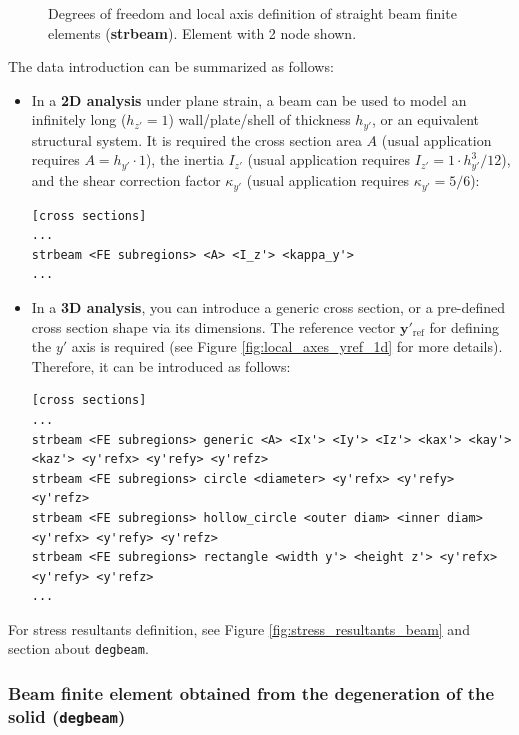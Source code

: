\documentclass[a4paper,fleqn]{book}
\begin{document}
\begin{figure}[h]

\caption{Degrees of freedom and local axis definition of straight beam finite elements (\textbf{strbeam}). Element with 2 node shown.}
\label{fig:strbeam}
\end{figure}

The data introduction can be summarized as follows:
\begin{itemize}
  \item In a \textbf{2D analysis} under plane strain, a beam can be used to model an infinitely long ($h_{z'}=1$) wall/plate/shell of thickness $h_{y'}$, or an equivalent structural system. It is required the cross section area $A$ (usual application requires $A = h_{y'}\cdot 1$), the inertia $I_{z'}$ (usual application requires $I_{z'} = 1\cdot h_{y'}^3/12$), and the shear correction factor $\kappa_{y'}$ (usual application requires $\kappa_{y'}=5/6$):
\begin{Verbatim}[frame=single, fontsize=\small, label={format of section [cross sections] for strbeam elements}]
[cross sections]
...
strbeam <FE subregions> <A> <I_z'> <kappa_y'>
...
\end{Verbatim}
  \item  In a \textbf{3D analysis}, you can introduce a generic cross section, or a pre-defined cross section shape via its dimensions. The reference vector $\mathbf{y}'_\mathrm{ref}$ for defining the $y'$ axis is required (see Figure \ref{fig:local_axes_yref_1d} for more details). Therefore, it can be introduced as follows:
\begin{Verbatim}[frame=single, fontsize=\footnotesize, label={format of section [cross sections] for strbeam elements}]
[cross sections]
...
strbeam <FE subregions> generic <A> <Ix'> <Iy'> <Iz'> <kax'> <kay'> <kaz'> <y'refx> <y'refy> <y'refz>
strbeam <FE subregions> circle <diameter> <y'refx> <y'refy> <y'refz>
strbeam <FE subregions> hollow_circle <outer diam> <inner diam> <y'refx> <y'refy> <y'refz>
strbeam <FE subregions> rectangle <width y'> <height z'> <y'refx> <y'refy> <y'refz>
...
\end{Verbatim}
\end{itemize}

For stress resultants definition, see Figure \ref{fig:stress_resultants_beam} and section about \texttt{degbeam}.

\subsubsection{Beam finite element obtained from the degeneration of the solid (\texttt{degbeam})}
\end{document}
